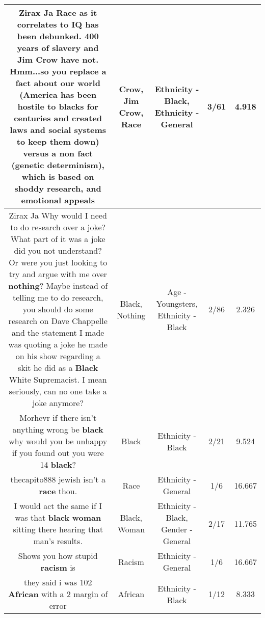 \documentclass[11pt]{article}
\newlength\mylength
\begin{document}
\begin{center}
\begin{longtable}{|C{.65\mylength}|C{.30\mylength}|C{.12\mylength}|C{.12\mylength}|C{.12\mylength}|}
  \small Zirax Ja \textbf{Race} as it correlates to IQ has been debunked. 400 years of slavery and \textbf{Jim C\textbf{row}} have not. Hmm...so you replace a fact about our world (America has been hostile to blacks for centuries and created laws and social systems to keep them down) versus a non fact (genetic determinism), which is based on shoddy research, and emotional appeals\normalsize   & Crow, Jim Crow, Race & Ethnicity - Black, Ethnicity - General & 3/61 & 4.918 \\  \hline
  \small Zirax Ja Why would I need to do research over a joke? What part of it was a joke did you not understand? Or were you just looking to try and argue with me over \textbf{nothing}? Maybe instead of telling me to do research, you should do some research on Dave Chappelle and the statement I made was quoting a joke he made on his show regarding a skit he did as a \textbf{Black} White Supremacist. I mean seriously, can no one take a joke anymore?\normalsize   & Black, Nothing & Age - Youngsters, Ethnicity - Black & 2/86 & 2.326 \\  \hline
  \small Morhevr if there isn't anything wrong be \textbf{black} why would you be unhappy if you found out you were 14 \textbf{black}?\normalsize   & Black & Ethnicity - Black & 2/21 & 9.524 \\  \hline
  \small thecapito888 jewish isn't a \textbf{race} thou.\normalsize   & Race & Ethnicity - General & 1/6 & 16.667 \\  \hline
  \small I would act the same if I was that \textbf{black} \textbf{woman} sitting there hearing that man's results.\normalsize   & Black, Woman & Ethnicity - Black, Gender - General & 2/17 & 11.765 \\  \hline
  \small Shows you how stupid \textbf{racism} is\normalsize   & Racism & Ethnicity - General & 1/6 & 16.667 \\  \hline
  \small they said i was 102 \textbf{African} with a 2 margin of error\normalsize   & African & Ethnicity - Black & 1/12 & 8.333 \\  \hline

\end{longtable}
\end{center}
\end{document}
